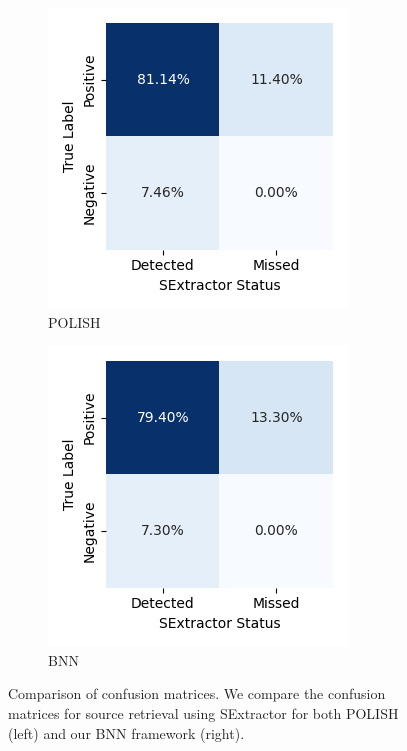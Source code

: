 \documentclass{article}
\begin{document}
\begin{figure}
    \centering
    \begin{subfigure}{0.3\linewidth}
        \includegraphics[width=\linewidth]{img/confusion.png}
        \caption{POLISH}
    \end{subfigure}
    \begin{subfigure}{0.3\linewidth}
        \includegraphics[width=\linewidth]{img/confusion_before.png}
        \caption{BNN}
    \end{subfigure}
    \caption{Comparison of confusion matrices. We compare the confusion matrices for source retrieval using SExtractor for both POLISH (left) and our BNN framework (right).}
    \label{fig:confuse}
\end{figure}
\end{document}
